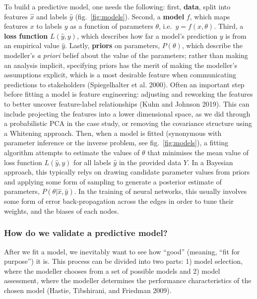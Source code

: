 \documentclass[11pt]{article}
\begin{document}
To build a predictive model, one needs the following: first,
\textbf{data}, split into features \(\hat{x}\) and labels \(\hat{y}\)
(fig.~\ref{fig:models}). Second, a \textbf{model} \(f\), which maps
features \(x\) to labels \(y\) as a function of parameters \(\theta\),
i.e.~\(y = f(x, \theta)\). Third, a \textbf{loss function}
\(L(\hat{y}, y)\), which describes how far a model's prediction \(y\) is
from an empirical value \(\hat{y}\). Lastly, \textbf{priors} on
parameters, \(P(\theta)\), which describe the modeller's \emph{a priori}
belief about the value of the parameters; rather than making an analysis
implicit, specifying priors has the merit of making the modeller's
assumptions explicit, which is a most desirable feature when
communicating predictions to stakeholders (Spiegelhalter et al. 2000).
Often an important step before fitting a model is feature engineering:
adjusting and reworking the features to better uncover feature-label
relationships (Kuhn and Johnson 2019). This can include projecting the
features into a lower dimensional space, as we did through a
probabilistic PCA in the case study, or removing the covariance
structure using a Whitening approach. Then, when a model is fitted
(synonymous with parameter inference or the inverse problem, see
fig.~\ref{fig:models}), a fitting algorithm attempts to estimate the
values of \(\theta\) that minimises the mean value of loss function
\(L(\hat{y},y)\) for all labels \(\hat{y}\) in the provided data \(Y\).
In a Bayesian approach, this typically relys on drawing candidate
parameter values from priors and applying some form of sampling to
generate a posterior estimate of parameters,
\(P(\theta | \hat{x}, \hat{y})\). In the training of neural networks,
this usually involves some form of error back-propagation across the
edges in order to tune their weights, and the biases of each nodes.

\hypertarget{how-do-we-validate-a-predictive-model}{%
\subsubsection{How do we validate a predictive
model?}\label{how-do-we-validate-a-predictive-model}}

After we fit a model, we inevitably want to see how ``good'' (meaning,
``fit for purpose'') it is. This process can be divided into two parts:
1) model selection, where the modeller chooses from a set of possible
models and 2) model assessment, where the modeller determines the
performance characteristics of the chosen model (Hastie, Tibshirani, and
Friedman 2009).
\end{document}
